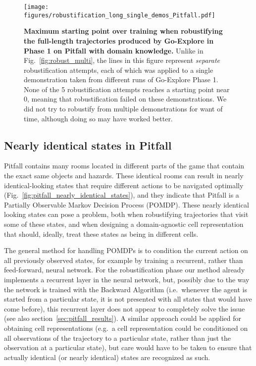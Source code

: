 \documentclass{article}
\begin{document}
\begin{figure}[tbh]
    \centering
    \texttt{[image: figures/robustification\_long\_single\_demos\_Pitfall.pdf]}
    \caption{\textbf{Maximum starting point over training when robustifying the full-length trajectories produced by Go-Explore in Phase 1 on Pitfall with domain knowledge.} Unlike in Fig.~\ref{fig:robust_multi}, the lines in this figure represent \emph{separate} robustification attempts, each of which was applied to a single demonstration taken from different runs of Go-Explore Phase 1. None of the 5 robustification attempts reaches a starting point near 0, meaning that robustification failed on these demonstrations. We did not try to robustify from multiple demonstrations for want of time, although doing so may have worked better.}
    \label{fig:pitfall_long_robustification_failure}
\end{figure}


\FloatBarrier

\subsection{Nearly identical states in Pitfall}
\label{sec:pitfall_nearly_identical_states}

Pitfall contains many rooms located in different parts of the game that contain the exact same objects and hazards. These identical rooms can result in nearly identical-looking states that require different actions to be navigated optimally (Fig.~\ref{fig:pitfall_nearly_identical_states}), and they indicate that Pitfall is a Partially Observable Markov Decision Process (POMDP). These nearly identical looking states can pose a problem, both when robustifying trajectories that visit some of these states, and when designing a domain-agnostic cell representation that should, ideally, treat these states as being in different cells.

The general method for handling POMDPs is to condition the current action on all previously observed states, for example by training a recurrent, rather than feed-forward, neural network. For the robustification phase our method already implements a recurrent layer in the neural network, but, possibly due to the way the network is trained with the Backward Algorithm (i.e.\ whenever the agent is started from a particular state, it is not presented with all states that would have come before), this recurrent layer does not appear to completely solve the issue (see also section~\ref{sec:pitfall_results}). A similar approach could be applied for obtaining cell representations (e.g.\ a cell representation could be conditioned on all observations of the trajectory to a particular state, rather than just the observation at a particular state), but care would have to be taken to ensure that actually identical (or nearly identical) states are recognized as such. 
\end{document}
